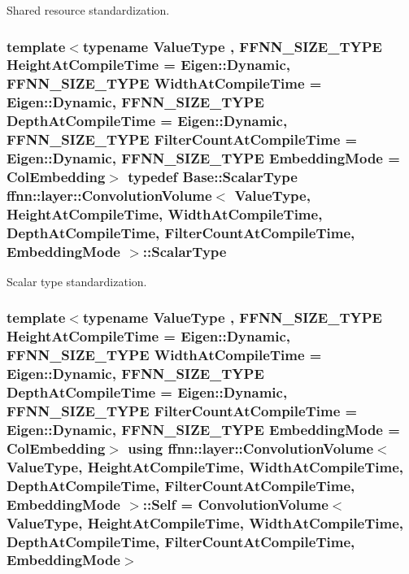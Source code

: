 Shared resource standardization. 

\hypertarget{classffnn_1_1layer_1_1_convolution_volume_aa9435c5ef8e0d2aa5cf57d2a2758a615}{
\subsubsection[{Scalar\-Type}]{\setlength{\rightskip}{0pt plus 5cm}template$<$typename Value\-Type , F\-F\-N\-N\-\_\-\-S\-I\-Z\-E\-\_\-\-T\-Y\-P\-E Height\-At\-Compile\-Time = Eigen\-::\-Dynamic, F\-F\-N\-N\-\_\-\-S\-I\-Z\-E\-\_\-\-T\-Y\-P\-E Width\-At\-Compile\-Time = Eigen\-::\-Dynamic, F\-F\-N\-N\-\_\-\-S\-I\-Z\-E\-\_\-\-T\-Y\-P\-E Depth\-At\-Compile\-Time = Eigen\-::\-Dynamic, F\-F\-N\-N\-\_\-\-S\-I\-Z\-E\-\_\-\-T\-Y\-P\-E Filter\-Count\-At\-Compile\-Time = Eigen\-::\-Dynamic, F\-F\-N\-N\-\_\-\-S\-I\-Z\-E\-\_\-\-T\-Y\-P\-E Embedding\-Mode = Col\-Embedding$>$ typedef {\bf Base\-::\-Scalar\-Type} {\bf ffnn\-::layer\-::\-Convolution\-Volume}$<$ Value\-Type, Height\-At\-Compile\-Time, Width\-At\-Compile\-Time, Depth\-At\-Compile\-Time, Filter\-Count\-At\-Compile\-Time, {\bf Embedding\-Mode} $>$\-::{\bf Scalar\-Type}}}\label{classffnn_1_1layer_1_1_convolution_volume_aa9435c5ef8e0d2aa5cf57d2a2758a615}


Scalar type standardization. 

\hypertarget{classffnn_1_1layer_1_1_convolution_volume_abd19bf15edd2f076cda0a71deb21cd69}{
\subsubsection[{Self}]{\setlength{\rightskip}{0pt plus 5cm}template$<$typename Value\-Type , F\-F\-N\-N\-\_\-\-S\-I\-Z\-E\-\_\-\-T\-Y\-P\-E Height\-At\-Compile\-Time = Eigen\-::\-Dynamic, F\-F\-N\-N\-\_\-\-S\-I\-Z\-E\-\_\-\-T\-Y\-P\-E Width\-At\-Compile\-Time = Eigen\-::\-Dynamic, F\-F\-N\-N\-\_\-\-S\-I\-Z\-E\-\_\-\-T\-Y\-P\-E Depth\-At\-Compile\-Time = Eigen\-::\-Dynamic, F\-F\-N\-N\-\_\-\-S\-I\-Z\-E\-\_\-\-T\-Y\-P\-E Filter\-Count\-At\-Compile\-Time = Eigen\-::\-Dynamic, F\-F\-N\-N\-\_\-\-S\-I\-Z\-E\-\_\-\-T\-Y\-P\-E Embedding\-Mode = Col\-Embedding$>$ using {\bf ffnn\-::layer\-::\-Convolution\-Volume}$<$ Value\-Type, Height\-At\-Compile\-Time, Width\-At\-Compile\-Time, Depth\-At\-Compile\-Time, Filter\-Count\-At\-Compile\-Time, {\bf Embedding\-Mode} $>$\-::{\bf Self} =  {\bf Convolution\-Volume}$<$Value\-Type, Height\-At\-Compile\-Time, Width\-At\-Compile\-Time, Depth\-At\-Compile\-Time, Filter\-Count\-At\-Compile\-Time, {\bf Embedding\-Mode}$>$}}\label{classffnn_1_1layer_1_1_convolution_volume_abd19bf15edd2f076cda0a71deb21cd69}


